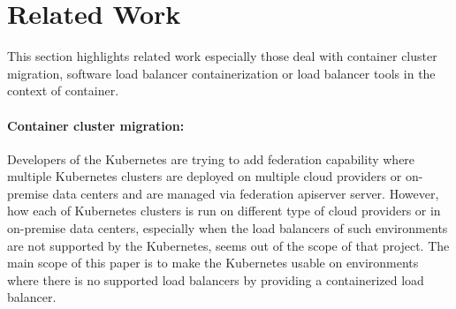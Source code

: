 \section{Related Work}\label{Related Work}
This section highlights related work especially those deal with container cluster migration, 
software load balancer containerization or load balancer tools in the context of container. 

\paragraph{\bf Container cluster migration:}
Developers of the Kubernetes are trying to add federation\cite{K8sFederation2017} capability 
where multiple Kubernetes clusters are deployed on multiple cloud providers or on-premise data centers 
and are managed via federation apiserver server. However, how each of Kubernetes clusters is run on different type of cloud providers
or in on-premise data centers, especially when the load balancers of such environments are not supported by the Kubernetes, 
seems out of the scope of that project. 
The main scope of this paper is to make the Kubernetes usable on environments where there is no supported load balancers
by providing a containerized load balancer.

